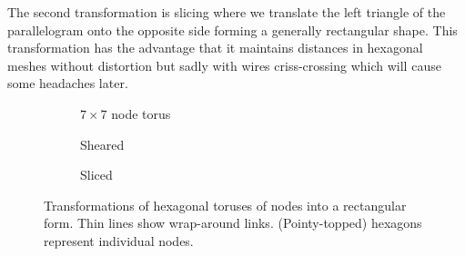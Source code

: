 			The second transformation is slicing where we translate the left triangle
			of the parallelogram onto the opposite side forming a generally
			rectangular shape. This transformation has the advantage that it
			maintains distances in hexagonal meshes without distortion but sadly with
			wires criss-crossing which will cause some headaches later.
			
			\begin{figure}
				\center
				\begin{subfigure}[b]{0.32\linewidth}
					\center
					
					
					\caption{$7 \times 7$ node torus}
					\label{fig:hexToPlaneNodeNative}
				\end{subfigure}
				\begin{subfigure}[b]{0.32\linewidth}
					\center
					
					
					\caption{Sheared}
					\label{fig:hexToPlaneNodeShear}
				\end{subfigure}
				\begin{subfigure}[b]{0.32\linewidth}
					\center
					
					
					\caption{Sliced}
					\label{fig:hexToPlaneNodeSlice}
				\end{subfigure}
				
				\caption{Transformations of hexagonal toruses of nodes into a
				rectangular form. Thin lines show wrap-around links. (Pointy-topped)
				hexagons represent individual nodes.}
				\label{fig:hexToPlaneNode}
			\end{figure}
			
